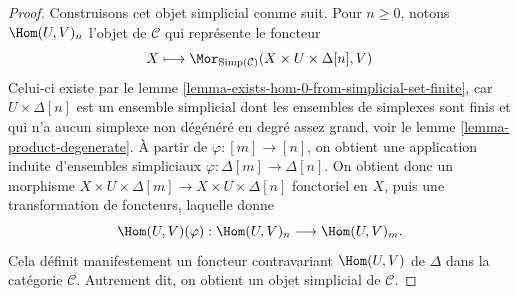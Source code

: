 \begin{proof}
Construisons cet objet simplicial comme suit.
Pour $n \geq 0$, notons $\Hom(U, V)_n$ l'objet de
$\mathcal{C}$ qui représente le foncteur
$$
X
\longmapsto
\Mor_{\text{Simp}(\mathcal{C})}(X \times U \times \Delta[n], V)
$$
Celui-ci existe par le lemme
\ref{lemma-exists-hom-0-from-simplicial-set-finite}, car
$U \times \Delta[n]$ est un ensemble simplicial dont les ensembles de
simplexes sont finis et qui n'a aucun simplexe non dégénéré en degré
assez grand, voir le lemme \ref{lemma-product-degenerate}.
À partir de $\varphi : [m] \to [n]$, on obtient une application induite
d'ensembles simpliciaux $\varphi : \Delta[m] \to \Delta[n]$. On obtient
donc un morphisme
$X \times U \times \Delta[m] \to X \times U \times \Delta[n]$
fonctoriel en $X$, puis une transformation de foncteurs, laquelle donne
$$
\Hom(U, V)(\varphi) :
\Hom(U, V)_n
\longrightarrow
\Hom(U, V)_m.
$$
Cela définit manifestement un foncteur contravariant
$\Hom(U, V)$ de $\Delta$ dans la catégorie $\mathcal{C}$.
Autrement dit, on obtient un objet simplicial de $\mathcal{C}$.


\end{proof}
